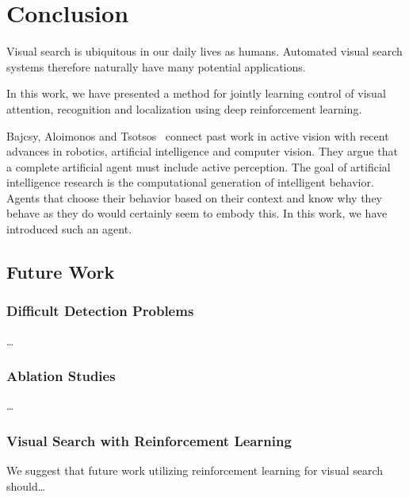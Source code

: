 \chapter{Conclusion}
\label{cha:conclusion}

% 

Visual search is ubiquitous in our daily lives as humans.
Automated visual search systems therefore naturally have many potential applications.

In this work, we have presented a method for jointly learning control of visual attention, recognition and localization using deep reinforcement learning.

Bajcsy, Aloimonos and Tsotsos~\cite{bajcsy_revisiting_2018} connect past work in active vision with recent advances in robotics, artificial intelligence and computer vision.
They argue that a complete artificial agent must include active perception.
The goal of artificial intelligence research is the computational generation of intelligent behavior.
Agents that choose their behavior based on their context and know why they behave as they do would certainly seem to embody this.
In this work, we have introduced such an agent.

\section{Future Work}

\subsection{Difficult Detection Problems}

\dots

\subsection{Ablation Studies}

\dots

\subsection{Visual Search with Reinforcement Learning}

We suggest that future work utilizing reinforcement learning for visual search should\dots

